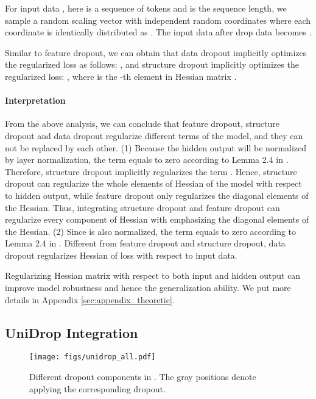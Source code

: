 \documentclass[11pt]{article}
\begin{document}
For input data , here  is a sequence of tokens and  is the sequence length, we sample a random scaling vector  with independent random coordinates where each coordinate is identically distributed as . The input data after drop data becomes .



Similar to feature dropout, we can obtain that data dropout implicitly optimizes the regularized loss as follows:
{\small}, and structure dropout implicitly optimizes the regularized loss: {\small}, where  is the -th element in Hessian matrix .

\paragraph{Interpretation} From the above analysis, we can conclude that feature dropout, structure dropout and data dropout regularize different terms of the model, and they can not be replaced by each other. 
(1) Because the hidden output will be normalized by layer normalization, the term  equals to zero according to Lemma 2.4 in . Therefore, structure dropout implicitly regularizes the term . Hence, structure dropout can regularize the whole elements of Hessian of the model with respect to hidden output, while feature dropout only regularizes the diagonal elements of the Hessian. Thus, integrating structure dropout and feature dropout can regularize every component of Hessian with emphasizing the diagonal elements of the Hessian. (2) Since  is also normalized, the term  equals to zero according to Lemma 2.4 in . Different from feature dropout and structure dropout, data dropout regularizes Hessian of loss with respect to input data.  

Regularizing Hessian matrix with respect to both input and hidden output can improve model robustness and hence the generalization ability. We put more details in Appendix \ref{sec:appendix_theoretic}.

\subsection{UniDrop Integration}

\begin{figure}[!tbp]
\centering
\texttt{[image: figs/unidrop\_all.pdf]}
\caption{Different dropout components in . The gray positions denote applying the corresponding dropout.}
\label{fig:unidrop}
\end{figure}
\end{document}
